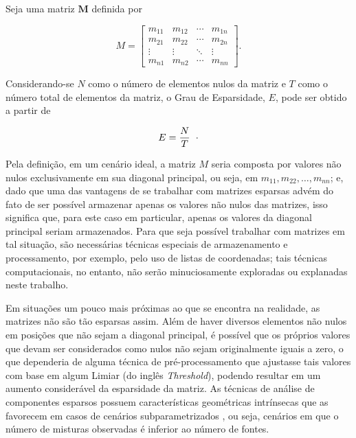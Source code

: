 \begin{definition}
    Seja uma matriz $\bm{M}$ definida por

    \begin{equation}
        M =
        \left[\begin{array}{cccc}
        m_{11} & m_{12} & \cdots & m_{1n} \\
        m_{21} & m_{22} & \cdots & m_{2n} \\
        \vdots & \vdots & \ddots & \vdots \\
        m_{n1} & m_{n2} & \cdots & m_{nn}
        \end{array}\right].
    \end{equation}

    Considerando-se $N$ como o número de elementos nulos da matriz e $T$ como o número total de elementos da matriz, o Grau de Esparsidade, $E$, pode ser obtido a partir de

    \begin{equation}
        E = \dfrac{N}{T}
        \hspace{0.2cm}\cdot
        \label{eq:bss_sparsity}
    \end{equation}

    \label{def:sparsity}
\end{definition}

Pela definição, em um cenário ideal, a matriz $M$ seria composta por valores não nulos exclusivamente em sua diagonal principal, ou seja, em $m_{11}, m_{22}, \dots , m_{nn}$; e, dado que uma das vantagens de se trabalhar com matrizes esparsas advém do fato de ser possível armazenar apenas os valores não nulos das matrizes, isso significa que, para este caso em particular, apenas os valores da diagonal principal seriam armazenados. Para que seja possível trabalhar com matrizes em tal situação, são necessárias técnicas especiais de armazenamento e processamento, por exemplo, pelo uso de listas de coordenadas; tais técnicas computacionais, no entanto, não serão minuciosamente exploradas ou explanadas neste trabalho.

Em situações um pouco mais próximas ao que se encontra na realidade, as matrizes não são tão esparsas assim. Além de haver diversos elementos não nulos em posições que não sejam a diagonal principal, é possível que os próprios valores que devam ser considerados como nulos não sejam originalmente iguais a zero, o que dependeria de alguma técnica de pré-processamento que ajustasse tais valores com base em algum Limiar (do inglês \textit{Threshold}), podendo resultar em um aumento considerável da esparsidade da matriz. As técnicas de análise de componentes esparsos possuem características geométricas intrínsecas que as favorecem em casos de cenários subparametrizados \citep{theis2003linear}, ou seja, cenários em que o número de misturas observadas é inferior ao número de fontes.

